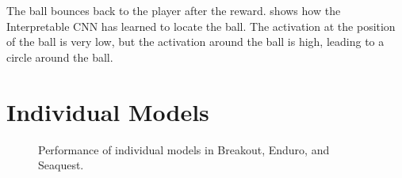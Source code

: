 The ball bounces back to the player after the reward.  shows how the Interpretable CNN has learned to locate the ball. The activation at the position of the ball is very low, but the activation around the ball is high, leading to a circle around the ball.


\FloatBarrier
\section{Individual Models}

\begin{figure}[ht!]
    \centering


    \caption{Performance of individual models in Breakout, Enduro, and Seaquest.}
    \label{fig:res:individual_models}
\end{figure}

